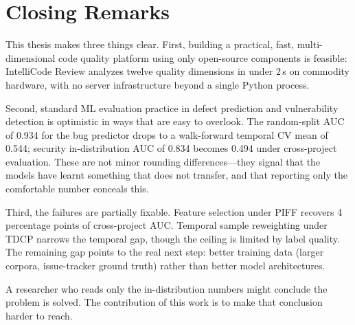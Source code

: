 \documentclass[12pt, oneside]{report}
\begin{document}
\section{Closing Remarks}
\label{sec:closing}

This thesis makes three things clear. First, building a practical, fast, multi-dimensional
code quality platform using only open-source components is feasible: IntelliCode Review
analyzes twelve quality dimensions in under 2\,s on commodity hardware, with no server
infrastructure beyond a single Python process.

Second, standard ML evaluation practice in defect prediction and vulnerability detection
is optimistic in ways that are easy to overlook. The random-split AUC of 0.934 for the
bug predictor drops to a walk-forward temporal CV mean of 0.544; security in-distribution
AUC of 0.834 becomes 0.494 under cross-project evaluation. These are not minor rounding
differences---they signal that the models have learnt something that does not transfer,
and that reporting only the comfortable number conceals this.

Third, the failures are partially fixable. Feature selection under PIFF recovers
4 percentage points of cross-project AUC. Temporal sample reweighting under TDCP
narrows the temporal gap, though the ceiling is limited by label quality. The remaining
gap points to the real next step: better training data (larger corpora, issue-tracker
ground truth) rather than better model architectures.

A researcher who reads only the in-distribution numbers might conclude the problem is
solved. The contribution of this work is to make that conclusion harder to reach.
\end{document}
